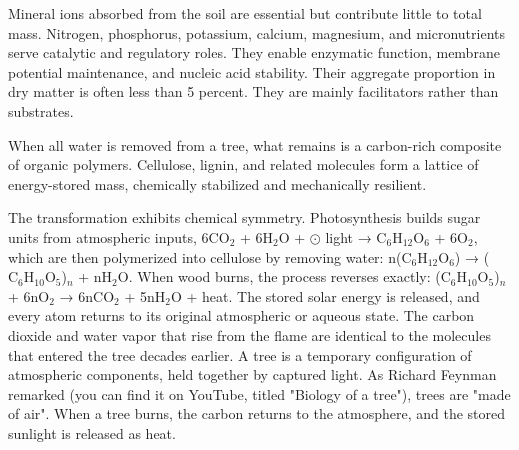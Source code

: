 Mineral ions absorbed from the soil are essential but contribute little to total mass. Nitrogen, phosphorus, potassium, calcium, magnesium, and micronutrients serve catalytic and regulatory roles. They enable enzymatic function, membrane potential maintenance, and nucleic acid stability. Their aggregate proportion in dry matter is often less than 5 percent. They are mainly facilitators rather than substrates.

When all water is removed from a tree, what remains is a carbon-rich composite of organic polymers. Cellulose, lignin, and related molecules form a lattice of energy-stored mass, chemically stabilized and mechanically resilient. 

The transformation exhibits chemical symmetry. Photosynthesis builds sugar units from atmospheric inputs, 6\(\mathrm{CO}_2\) + 6\(\mathrm{H}_2\mathrm{O}\) + \(\odot\) light → \(\mathrm{C}_6\mathrm{H}_{12}\mathrm{O}_6\) + 6\(\mathrm{O}_2\), which are then polymerized into cellulose by removing water: n(\(\mathrm{C}_6\mathrm{H}_{12}\mathrm{O}_6\)) → (\(\mathrm{C}_6\mathrm{H}_{10}\mathrm{O}_5\))\(_n\) + n\(\mathrm{H}_2\mathrm{O}\). When wood burns, the process reverses exactly: (\(\mathrm{C}_6\mathrm{H}_{10}\mathrm{O}_5\))\(_n\) + 6n\(\mathrm{O}_2\) → 6n\(\mathrm{CO}_2\) + 5n\(\mathrm{H}_2\mathrm{O}\) + \Fire{} heat. The stored solar energy is released, and every atom returns to its original atmospheric or aqueous state. The carbon dioxide and water vapor that rise from the flame are identical to the molecules that entered the tree decades earlier. A tree is a temporary configuration of atmospheric components, held together by captured light. As Richard Feynman remarked (you can find it on YouTube, titled "Biology of a tree"), trees are "made of air". When a tree burns, the carbon returns to the atmosphere, and the stored sunlight is released as heat.

